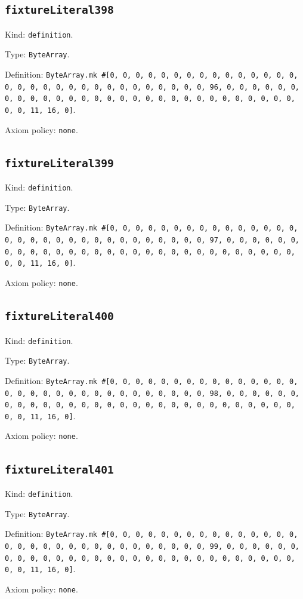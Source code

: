 \documentclass[11pt]{article}
\begin{document}
\subsection*{\texttt{fixtureLiteral398}}
\noindent Kind: \texttt{definition}.\par
\noindent Type: \texttt{ByteArray}.\par
\noindent Definition: \texttt{ByteArray.mk \#[0, 0, 0, 0, 0, 0, 0, 0, 0, 0, 0, 0, 0, 0, 0, 0, 0, 0, 0, 0, 0, 0, 0, 0, 0, 0, 0, 0, 0, 0, 0, 96, 0, 0, 0, 0, 0, 0, 0, 0, 0, 0, 0, 0, 0, 0, 0, 0, 0, 0, 0, 0, 0, 0, 0, 0, 0, 0, 0, 0, 0, 0, 0, 11, 16, 0]}.\par
\noindent Axiom policy: \texttt{none}.\par
\subsection*{\texttt{fixtureLiteral399}}
\noindent Kind: \texttt{definition}.\par
\noindent Type: \texttt{ByteArray}.\par
\noindent Definition: \texttt{ByteArray.mk \#[0, 0, 0, 0, 0, 0, 0, 0, 0, 0, 0, 0, 0, 0, 0, 0, 0, 0, 0, 0, 0, 0, 0, 0, 0, 0, 0, 0, 0, 0, 0, 97, 0, 0, 0, 0, 0, 0, 0, 0, 0, 0, 0, 0, 0, 0, 0, 0, 0, 0, 0, 0, 0, 0, 0, 0, 0, 0, 0, 0, 0, 0, 0, 11, 16, 0]}.\par
\noindent Axiom policy: \texttt{none}.\par
\subsection*{\texttt{fixtureLiteral400}}
\noindent Kind: \texttt{definition}.\par
\noindent Type: \texttt{ByteArray}.\par
\noindent Definition: \texttt{ByteArray.mk \#[0, 0, 0, 0, 0, 0, 0, 0, 0, 0, 0, 0, 0, 0, 0, 0, 0, 0, 0, 0, 0, 0, 0, 0, 0, 0, 0, 0, 0, 0, 0, 98, 0, 0, 0, 0, 0, 0, 0, 0, 0, 0, 0, 0, 0, 0, 0, 0, 0, 0, 0, 0, 0, 0, 0, 0, 0, 0, 0, 0, 0, 0, 0, 11, 16, 0]}.\par
\noindent Axiom policy: \texttt{none}.\par
\subsection*{\texttt{fixtureLiteral401}}
\noindent Kind: \texttt{definition}.\par
\noindent Type: \texttt{ByteArray}.\par
\noindent Definition: \texttt{ByteArray.mk \#[0, 0, 0, 0, 0, 0, 0, 0, 0, 0, 0, 0, 0, 0, 0, 0, 0, 0, 0, 0, 0, 0, 0, 0, 0, 0, 0, 0, 0, 0, 0, 99, 0, 0, 0, 0, 0, 0, 0, 0, 0, 0, 0, 0, 0, 0, 0, 0, 0, 0, 0, 0, 0, 0, 0, 0, 0, 0, 0, 0, 0, 0, 0, 11, 16, 0]}.\par
\noindent Axiom policy: \texttt{none}.\par
\end{document}
